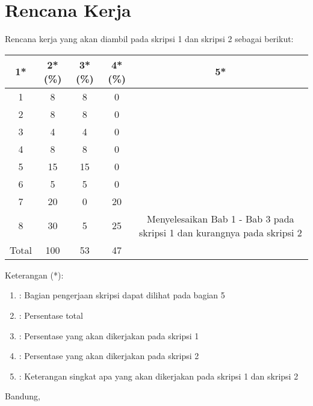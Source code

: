 \documentclass[a4paper,twoside]{article}
\begin{document}
\section{Rencana Kerja}
Rencana kerja yang akan diambil pada skripsi 1 dan skripsi 2 sebagai berikut:
\begin{table}[H]
	\centering
	\begin{tabular}{|c|c|c|c|c|}
		\hline
		1* & 2*(\%) & 3*(\%) & 4*(\%) & 5*\\
		\hline
		1 & 8 & 8 & 0 & \\
		\hline
		2 & 8 & 8 & 0 & \\
		\hline
		3 & 4 & 4 & 0 & \\
		\hline
		4 & 8 & 8 & 0 & \\
		\hline
		5 & 15 & 15 & 0 & \\
		\hline
		6 & 5 & 5 & 0 & \\
		\hline
		7 & 20 & 0 & 20 & \\
		\hline
		8 & 30 & 5 & 25 & Menyelesaikan Bab 1 - Bab 3 pada skripsi 1 dan kurangnya pada skripsi 2\\
		\hline
		Total & 100 & 53 & 47 &  \\
		\hline
		
	\end{tabular}
\end{table}	

Keterangan (*):
\begin{enumerate}
	\item : Bagian pengerjaan skripsi dapat dilihat pada bagian 5 
	\item : Persentase total
	\item : Persentase yang akan dikerjakan pada skripsi 1
	\item : Persentase yang akan dikerjakan pada skripsi 2
	\item : Keterangan singkat apa yang akan dikerjakan pada skripsi 1 dan skripsi 2
\end{enumerate}


\vspace{1cm}
\centering Bandung, \tanggal\\
\vspace{2cm} \nama \\ 
\vspace{1cm}
\end{document}
